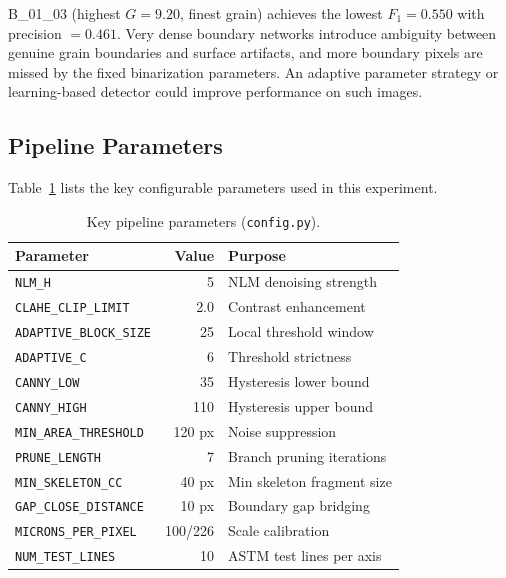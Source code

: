 \documentclass[12pt,a4paper]{article}
\newcommand{\code}[1]{\texttt{#1}}
\newcommand{\file}[1]{\texttt{\small #1}}
\begin{document}
B\_01\_03 (highest $G = 9.20$, finest grain) achieves the lowest
$F_1 = 0.550$ with precision $= 0.461$. Very dense boundary networks
introduce ambiguity between genuine grain boundaries and surface artifacts,
and more boundary pixels are missed by the fixed binarization parameters.
An adaptive parameter strategy or learning-based detector could improve
performance on such images.

\subsection{Pipeline Parameters}

Table~\ref{tab:params} lists the key configurable parameters used in
this experiment.

\begin{table}[H]
    \centering
    \caption{Key pipeline parameters (\file{config.py}).}
    \label{tab:params}
    \begin{tabular}{lrl}
        \toprule
        \textbf{Parameter} & \textbf{Value} & \textbf{Purpose} \\
        \midrule
        \code{NLM\_H}                 & 5             & NLM denoising strength \\
        \code{CLAHE\_CLIP\_LIMIT}     & 2.0           & Contrast enhancement \\
        \code{ADAPTIVE\_BLOCK\_SIZE}  & 25            & Local threshold window \\
        \code{ADAPTIVE\_C}            & 6             & Threshold strictness \\
        \code{CANNY\_LOW}             & 35            & Hysteresis lower bound \\
        \code{CANNY\_HIGH}            & 110           & Hysteresis upper bound \\
        \code{MIN\_AREA\_THRESHOLD}   & 120 px        & Noise suppression \\
        \code{PRUNE\_LENGTH}          & 7             & Branch pruning iterations \\
        \code{MIN\_SKELETON\_CC}      & 40 px         & Min skeleton fragment size \\
        \code{GAP\_CLOSE\_DISTANCE}   & 10 px         & Boundary gap bridging \\
        \code{MICRONS\_PER\_PIXEL}    & 100/226       & Scale calibration \\
        \code{NUM\_TEST\_LINES}       & 10            & ASTM test lines per axis \\
        \bottomrule
    \end{tabular}
\end{table}
\end{document}
